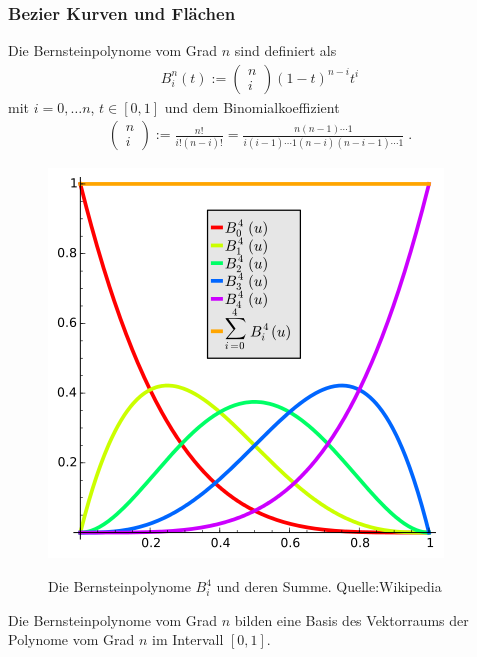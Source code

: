 \subsubsection{Bezier Kurven und Flächen}
\begin{Definition}
Die Bernsteinpolynome vom Grad $n$ sind definiert als
\begin{align*}
B_i^n(t) := \begin{pmatrix} n \\ i \end{pmatrix} (1-t)^{n-i}t^i
\end{align*}
mit $i = 0, \hdots n$, $t \in [0,1]$ und dem Binomialkoeffizient
\begin{align*}
\begin{pmatrix} n \\ i \end{pmatrix} := \frac{n!}{i!(n-i)!} = \frac{n(n-1) \cdots 1}{i(i-1) \cdots 1 (n-i) (n-i-1) \cdots 1 } \; .
\end{align*}
\end{Definition}

\begin{figure}[H]
    \centering
    \includegraphics[scale=0.8]{images/Bernstein_Polynomials.png}
    \label{fig:bernstein-polynomial}
    \caption{Die Bernsteinpolynome $B^{4}_i$ und deren Summe. Quelle:Wikipedia}
\end{figure}

\begin{Bemerkung}
Die Bernsteinpolynome vom Grad $n$ bilden eine Basis des Vektorraums der Polynome vom Grad $n$ im Intervall $[0,1]$.
\end{Bemerkung}

